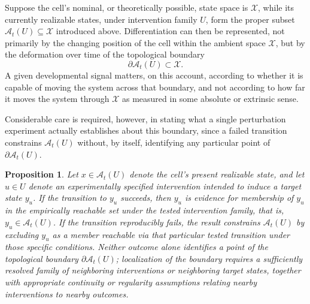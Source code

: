 \documentclass[11pt]{article}
\newtheorem{proposition}{Proposition}
\begin{document}
Suppose the cell's nominal, or theoretically possible, state space is $\mathcal{X}$, while its currently realizable states, under intervention family $U$, form the proper subset $\mathcal{A}_t(U) \subseteq \mathcal{X}$ introduced above. Differentiation can then be represented, not primarily by the changing position of the cell within the ambient space $\mathcal{X}$, but by the deformation over time of the topological boundary
\begin{equation}
\partial \mathcal{A}_t(U) \subset \mathcal{X}.
\end{equation}
A given developmental signal matters, on this account, according to whether it is capable of moving the system across that boundary, and not according to how far it moves the system through $\mathcal{X}$ as measured in some absolute or extrinsic sense.

Considerable care is required, however, in stating what a single perturbation experiment actually establishes about this boundary, since a failed transition constrains $\mathcal{A}_t(U)$ without, by itself, identifying any particular point of $\partial \mathcal{A}_t(U)$.

\begin{proposition}
Let $x \in \mathcal{A}_t(U)$ denote the cell's present realizable state, and let $u \in U$ denote an experimentally specified intervention intended to induce a target state $y_u$. If the transition to $y_u$ succeeds, then $y_u$ is evidence for membership of $y_u$ in the empirically reachable set under the tested intervention family, that is, $y_u \in \mathcal{A}_t(U)$. If the transition reproducibly fails, the result constrains $\mathcal{A}_t(U)$ by excluding $y_u$ as a member reachable via that particular tested transition under those specific conditions. Neither outcome alone identifies a point of the topological boundary $\partial \mathcal{A}_t(U)$; localization of the boundary requires a sufficiently resolved family of neighboring interventions or neighboring target states, together with appropriate continuity or regularity assumptions relating nearby interventions to nearby outcomes.
\end{proposition}
\end{document}

